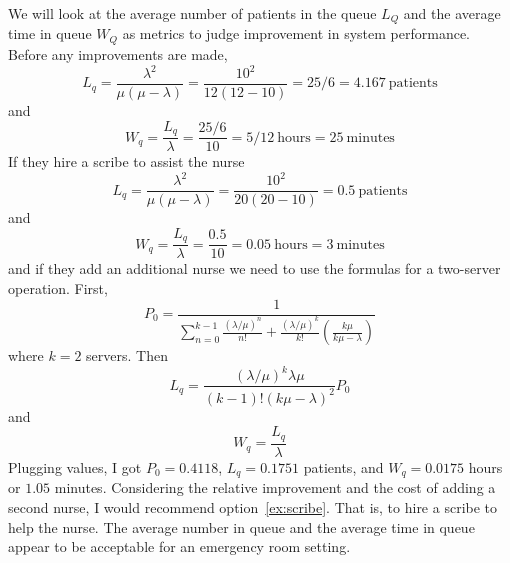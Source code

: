 \begin{enumerate}
\begin{solution}
  \bs We will look at the average number of patients in the queue
  $L_Q$ and the average time in queue $W_Q$ as metrics to judge
  improvement in system performance. Before any improvements are made,
\[ L_q = \frac{\lambda^2}{\mu(\mu-\lambda)} = \frac{10^2}{12(12-10)} = 25/6 = 4.167~\text{patients} \]
and
\[W_q = \frac{L_q}{\lambda} = \frac{25/6}{10} = 5/12~\text{hours} = 25~\text{minutes} \]
If they hire a scribe to assist the nurse
\[ L_q = \frac{\lambda^2}{\mu(\mu-\lambda)} = \frac{10^2}{20(20-10)} = 0.5~\text{patients} \]
and
\[W_q = \frac{L_q}{\lambda} = \frac{0.5}{10} = 0.05~\text{hours} =
  3~\text{minutes} \] 
and if they add an additional nurse we need to
use the formulas for a two-server operation. First,
\[ P_0 = \frac{1}{\sum_{n=0}^{k-1}\frac{\left(\lambda/\mu\right)^n}{n!} + \frac{\left(\lambda/\mu\right)^k}{k!}\left(\frac{k\mu}{k\mu-\lambda}\right)} \]
where $k=2$ servers. Then
\[ L_q = \frac{\left(\lambda/\mu\right)^k\lambda\mu}{(k-1)!(k\mu-\lambda)^2}P_0 \]
and
\[W_q = \frac{L_q}{\lambda} \] 
Plugging values, I got $P_0=0.4118$,
$L_q=0.1751$ patients, and $W_q=0.0175$ hours or $1.05$ minutes.
Considering the relative improvement and the cost of adding a second
nurse, I would recommend option~\ref{ex:scribe}. That is, to hire a scribe to help
the nurse. The average number in queue and the average time in queue
appear to be acceptable for an emergency room setting.
\end{solution}


\end{enumerate}

